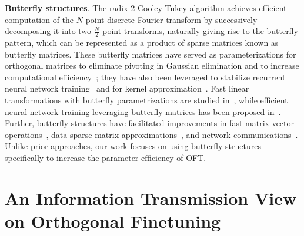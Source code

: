 \textbf{Butterfly structures}. The radix-2 Cooley-Tukey algorithm achieves efficient computation of the $N$-point discrete Fourier transform by successively decomposing it into two $\frac{N}{2}$-point transforms, naturally giving rise to the butterfly pattern, which can be represented as a product of sparse matrices known as butterfly matrices. These butterfly matrices have served as parameterizations for orthogonal matrices to eliminate pivoting in Gaussian elimination and to increase computational efficiency~\cite{parker1995random}; they have also been leveraged to stabilize recurrent neural network training~\cite{jing2017tunable} and for kernel approximation~\cite{munkhoeva2018quadrature}. Fast linear transformations with butterfly parametrizations are studied in~\cite{dao2019learning,dao2019kaleidoscope}, while efficient neural network training leveraging butterfly matrices has been proposed in~\cite{chen2022pixelated,dao2022monarch}. Further, butterfly structures have facilitated improvements in fast matrix-vector operations~\cite{michielssen1996multilevel,o2010algorithm}, data-sparse matrix approximations~\cite{li2015butterfly}, and network communications~\cite{klasing1994broadcasting,li2003linear,rajasingh2016transmission}. Unlike prior approaches, our work focuses on using butterfly structures specifically to increase the parameter efficiency of OFT.

\section{An Information Transmission View on Orthogonal Finetuning}

